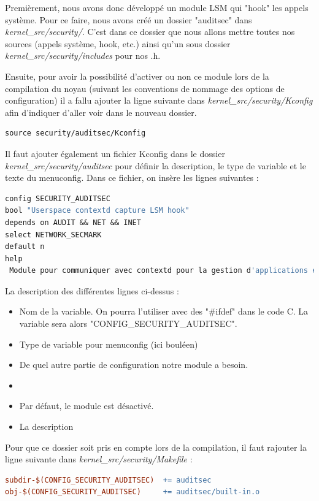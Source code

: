 \documentclass[pdftex,a4paper,titlepage,11pt]{article}
\begin{document}
Premièrement, nous avons donc développé un module LSM qui "hook" les appels système. Pour ce faire, nous avons créé un dossier "auditsec" dans \textit{{kernel\_src}/security/}. C'est dans ce dossier que nous allons mettre toutes nos sources (appels système, hook, etc.) ainsi qu'un sous dossier \textit{{kernel\_src}/security/includes} pour nos .h.  

Ensuite,  pour avoir la possibilité d'activer ou non ce module lors de la compilation du noyau (suivant les conventions de nommage des options de configuration) il a fallu ajouter la ligne suivante dans \textit{{kernel\_src}/security/Kconfig} afin d'indiquer d'aller voir dans le nouveau dossier.


\begin{lstlisting}[language=make]
source security/auditsec/Kconfig
\end{lstlisting}

Il faut ajouter également un fichier Kconfig dans le dossier \textit{{kernel\_src}/security/auditsec} pour définir la description, le type de variable et le texte du menuconfig. Dans ce fichier, on insère les lignes suivantes :

\begin{lstlisting}[language=make]
config SECURITY_AUDITSEC
bool "Userspace contextd capture LSM hook"
depends on AUDIT && NET && INET
select NETWORK_SECMARK
default n
help
 Module pour communiquer avec contextd pour la gestion d'applications en userspace.
\end{lstlisting}

La description des différentes lignes ci-dessus :
\begin{itemize}
	\item Nom de la variable. On pourra l'utiliser avec des "\#ifdef" dans le code C. La variable sera alors "CONFIG\_SECURITY\_AUDITSEC".
	\item Type de variable pour menuconfig (ici bouléen)
	\item De quel autre partie de configuration notre module a besoin.
	\item
	\item Par défaut, le module est désactivé.
	\item La description
\end{itemize}

 Pour que ce dossier soit pris en compte lors de la compilation, il faut rajouter la ligne suivante dans \textit{{kernel\_src}/security/Makefile} :

\begin{lstlisting}[language=make]
subdir-$(CONFIG_SECURITY_AUDITSEC)  += auditsec	
obj-$(CONFIG_SECURITY_AUDITSEC)     += auditsec/built-in.o
\end{lstlisting}
\end{document}
